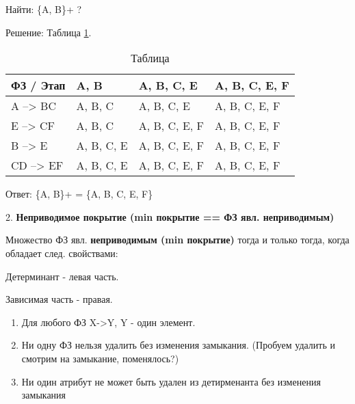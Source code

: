 Найти: \{A, B\}+ ?

Решение: Таблица \ref{fig:ref12}.


\begin{table}[ht]
	\centering
	\begin{tabular}{ | l | l | l | l |}
		\hline
		ФЗ / Этап & A, B       & A, B, C, E    & A, B, C, E, F \\  \hline
		A --> BC  & A, B, C    & A, B, C, E    & A, B, C, E, F \\ \hline
		E --> CF  & A, B, C    & A, B, C, E, F & A, B, C, E, F \\ \hline
		B --> E   & A, B, C, E & A, B, C, E, F & A, B, C, E, F \\ \hline
		CD --> EF & A, B, C, E & A, B, C, E, F & A, B, C, E, F \\ \hline
		\hline
	\end{tabular}
	\caption{Таблица}
	\label{fig:ref12}
\end{table}

Ответ: \{A, B\}+ = \{A, B, C, E, F\}



2. \textbf{Неприводимое покрытие (min покрытие == ФЗ явл. неприводимым)}

Множество ФЗ явл. \textbf{неприводимым (min покрытие)} тогда и только тогда,
когда обладает след. свойствами:

Детерминант - левая часть.

Зависимая часть - правая.

\begin{enumerate}
	\item Для любого ФЗ X->Y, Y - один элемент.
	\item Ни одну ФЗ нельзя удалить без изменения замыкания. (Пробуем удалить и смотрим на замыкание, поменялось?)
	\item Ни один атрибут не может быть удален из детирменанта без изменения замыкания
\end{enumerate}


